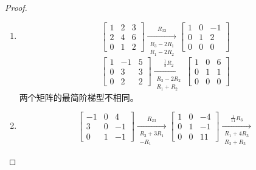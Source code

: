 \begin{proof}
    \begin{enumerate}
        \item \begin{equation*}
                  \begin{bmatrix}1&2&3\\2&4&6\\0&1&2\end{bmatrix}\xrightarrow[\substack{R_3-2R_1\\R_1-2R_2}]{R_{23}}
                  \begin{bmatrix}
                      1 & 0 & -1 \\
                      0 & 1 & 2  \\
                      0 & 0 & 0
                  \end{bmatrix}
              \end{equation*}
              \begin{equation*}
                  \begin{bmatrix}1&-1&5\\0&3&3\\0&2&2\end{bmatrix}\xrightarrow[\substack{R_3-2R_2\\R_1+R_2}]{\frac{1}{3}R_2}
                  \begin{bmatrix}
                      1 & 0 & 6 \\
                      0 & 1 & 1 \\
                      0 & 0 & 0
                  \end{bmatrix}
              \end{equation*}
              两个矩阵的最简阶梯型不相同。
        \item \begin{equation*}
                  \begin{bmatrix}-1&0&4\\3&0&-1\\0&1&-1\end{bmatrix}\xrightarrow[\substack{R_3+3R_1\\-R_1}]{R_{23}}
                  \begin{bmatrix}
                      1 & 0 & -4 \\
                      0 & 1 & -1 \\
                      0 & 0 & 11
                  \end{bmatrix}\xrightarrow[\substack{R_1+4R_3\\R_2+R_3}]{\frac{1}{11}R_3}

\end{equation*}
\end{enumerate}
\end{proof}
